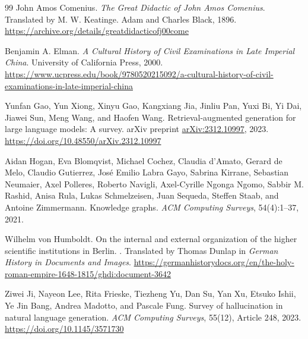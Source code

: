 \documentclass[11pt,letterpaper]{article}
\begin{document}
\begin{thebibliography}{99}
John Amos Comenius.
\newblock \emph{The Great Didactic of John Amos Comenius}.
\newblock Translated by M. W. Keatinge. Adam and Charles Black, 1896.
\newblock \href{https://archive.org/details/greatdidacticofj00come}{https://archive.org/details/greatdidacticofj00come}

Benjamin A. Elman.
\newblock \emph{A Cultural History of Civil Examinations in Late Imperial China}.
\newblock University of California Press, 2000.
\newblock \href{https://www.ucpress.edu/book/9780520215092/a-cultural-history-of-civil-examinations-in-late-imperial-china}{https://www.ucpress.edu/book/9780520215092/a-cultural-history-of-civil-examinations-in-late-imperial-china}

Yunfan Gao, Yun Xiong, Xinyu Gao, Kangxiang Jia, Jinliu Pan, Yuxi Bi, Yi Dai, Jiawei Sun, Meng Wang, and Haofen Wang.
\newblock Retrieval-augmented generation for large language models: A survey.
\newblock arXiv preprint \href{https://arxiv.org/abs/2312.10997}{arXiv:2312.10997}, 2023.
\newblock \href{https://doi.org/10.48550/arXiv.2312.10997}{https://doi.org/10.48550/arXiv.2312.10997}

Aidan Hogan, Eva Blomqvist, Michael Cochez, Claudia d'Amato, Gerard de Melo, Claudio Gutierrez, Jos\'{e} Emilio Labra Gayo, Sabrina Kirrane, Sebastian Neumaier, Axel Polleres, Roberto Navigli, Axel-Cyrille Ngonga Ngomo, Sabbir M. Rashid, Anisa Rula, Lukas Schmelzeisen, Juan Sequeda, Steffen Staab, and Antoine Zimmermann.
\newblock Knowledge graphs.
\newblock \emph{ACM Computing Surveys}, 54(4):1--37, 2021.

Wilhelm von Humboldt.
\newblock On the internal and external organization of the higher scientific institutions in Berlin.
.
\newblock Translated by Thomas Dunlap in \emph{German History in Documents and Images}.
\newblock \href{https://germanhistorydocs.org/en/the-holy-roman-empire-1648-1815/ghdi:document-3642}{https://germanhistorydocs.org/en/the-holy-roman-empire-1648-1815/ghdi:document-3642}

Ziwei Ji, Nayeon Lee, Rita Frieske, Tiezheng Yu, Dan Su, Yan Xu, Etsuko Ishii, Ye Jin Bang, Andrea Madotto, and Pascale Fung.
\newblock Survey of hallucination in natural language generation.
\newblock \emph{ACM Computing Surveys}, 55(12), Article 248, 2023.
\newblock \href{https://doi.org/10.1145/3571730}{https://doi.org/10.1145/3571730}


\end{thebibliography}
\end{document}
